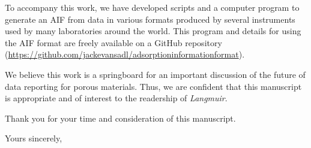 \documentclass[11pt, a4paper]{letter} %
\begin{document}
\begin{letter}{ }
To accompany this work, we have developed scripts and a computer program to generate an AIF from data in various formats produced by several instruments used by many laboratories around the world. This program and details for using the AIF format are freely available on a GitHub repository (\url{https://github.com/jackevansadl/adsorptioninformationformat}).

We believe this work is a springboard for an important discussion of the future of data reporting for porous materials. Thus, we are confident that this manuscript is appropriate and of interest to the readership of \textit{Langmuir}.


Thank you for your time and consideration of this manuscript.
\closing{Yours sincerely,}




\vfill

\end{letter}
\end{document}
